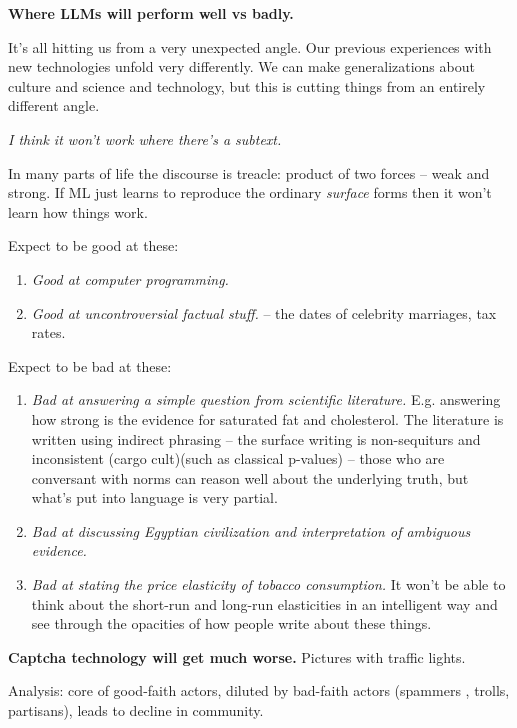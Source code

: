 \documentclass[
  11pt,
  letterpaper,
  DIV=11,
  numbers=noendperiod,
  oneside]{scrartcl}
\providecommand{\tightlist}{%
  \setlength{\itemsep}{0pt}\setlength{\parskip}{0pt}}\usepackage{longtable,booktabs,array}
\begin{document}
\textbf{Where LLMs will perform well vs badly.}

It's all hitting us from a very unexpected angle. Our previous
experiences with new technologies unfold very differently. We can make
generalizations about culture and science and technology, but this is
cutting things from an entirely different angle.

\emph{I think it won't work where there's a subtext.}

In many parts of life the discourse is treacle: product of two forces --
weak and strong. If ML just learns to reproduce the ordinary
\emph{surface} forms then it won't learn how things work.

Expect to be good at these:

\begin{enumerate}
\def\labelenumi{\arabic{enumi}.}
\tightlist
\item
  \emph{Good at computer programming.}
\item
  \emph{Good at uncontroversial factual stuff.} -- the dates of
  celebrity marriages, tax rates.
\end{enumerate}

Expect to be bad at these:

\begin{enumerate}
\def\labelenumi{\arabic{enumi}.}
\item
  \emph{Bad at answering a simple question from scientific literature.}
  E.g. answering how strong is the evidence for saturated fat and
  cholesterol. The literature is written using indirect phrasing -- the
  surface writing is non-sequiturs and inconsistent (cargo cult)(such as
  classical p-values) -- those who are conversant with norms can reason
  well about the underlying truth, but what's put into language is very
  partial.
\item
  \emph{Bad at discussing Egyptian civilization and interpretation of
  ambiguous evidence.}
\item
  \emph{Bad at stating the price elasticity of tobacco consumption.} It
  won't be able to think about the short-run and long-run elasticities
  in an intelligent way and see through the opacities of how people
  write about these things.
\end{enumerate}

\textbf{Captcha technology will get much worse.} Pictures with traffic
lights.

Analysis: core of good-faith actors, diluted by bad-faith actors
(spammers , trolls, partisans), leads to decline in community.
\end{document}
